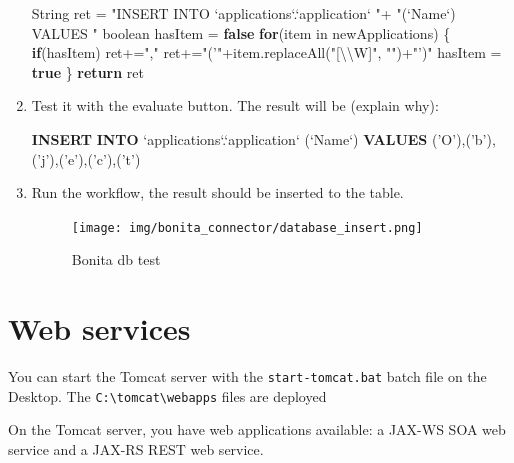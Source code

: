 \documentclass[]{report}
\newenvironment{Shaded}{}{}
\newcommand{\KeywordTok}[1]{\textcolor[rgb]{0.00,0.44,0.13}{\textbf{{#1}}}}
\newcommand{\DataTypeTok}[1]{\textcolor[rgb]{0.56,0.13,0.00}{{#1}}}
\newcommand{\CharTok}[1]{\textcolor[rgb]{0.25,0.44,0.63}{{#1}}}
\newcommand{\StringTok}[1]{\textcolor[rgb]{0.25,0.44,0.63}{{#1}}}
\newcommand{\FunctionTok}[1]{\textcolor[rgb]{0.02,0.16,0.49}{{#1}}}
\newcommand{\NormalTok}[1]{{#1}}
\begin{document}
\begin{enumerate}
\begin{Shaded}
\begin{Highlighting}[]
\NormalTok{String ret =}
  \StringTok{"INSERT INTO `applications`.`application` "}\NormalTok{+}
  \StringTok{"(`Name`) VALUES "}
\DataTypeTok{boolean} \NormalTok{hasItem = }\KeywordTok{false}
\KeywordTok{for}\NormalTok{(item in newApplications) \{}
  \KeywordTok{if}\NormalTok{(hasItem) ret+=}\StringTok{","}
  \NormalTok{ret+=}\StringTok{"('"}\NormalTok{+item.}\FunctionTok{replaceAll}\NormalTok{(}\StringTok{"[}\CharTok{\textbackslash{}\textbackslash{}}\StringTok{W]"}\NormalTok{, }\StringTok{""}\NormalTok{)+}\StringTok{"')"}
  \NormalTok{hasItem = }\KeywordTok{true}
\NormalTok{\}}
\KeywordTok{return} \NormalTok{ret}
\end{Highlighting}
\end{Shaded}
\item
  Test it with the evaluate button. The result will be (explain why):

\begin{Shaded}
\begin{Highlighting}[]
\KeywordTok{INSERT} \KeywordTok{INTO} \NormalTok{`applications`.`application` (`Name`) }\KeywordTok{VALUES} \NormalTok{(}\StringTok{'O'}\NormalTok{),(}\StringTok{'b'}\NormalTok{),(}\StringTok{'j'}\NormalTok{),(}\StringTok{'e'}\NormalTok{),(}\StringTok{'c'}\NormalTok{),(}\StringTok{'t'}\NormalTok{)}
\end{Highlighting}
\end{Shaded}
\item
  Run the workflow, the result should be inserted to the table.

  \begin{figure}[htbp]
  \centering
  \texttt{[image: img/bonita\_connector/database\_insert.png]}
  \caption{Bonita db test}
  \end{figure}
\end{enumerate}

\section{Web services}

You can start the Tomcat server with the \texttt{start-tomcat.bat} batch
file on the Desktop. The
\texttt{C:\textbackslash{}tomcat\textbackslash{}webapps} files are
deployed

On the Tomcat server, you have web applications available: a JAX-WS SOA
web service and a JAX-RS REST web service.
\end{document}
